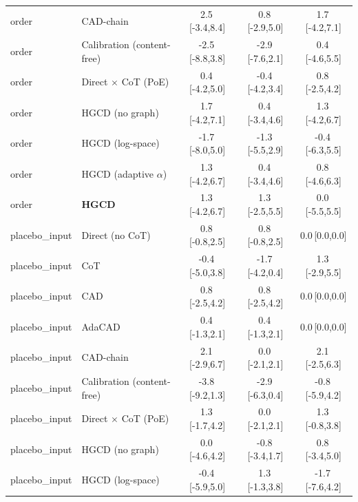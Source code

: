 \begin{tabular}{llccc}
order & CAD-chain & 2.5\,{\scriptsize[-3.4,8.4]} & 0.8\,{\scriptsize[-2.9,5.0]} & 1.7\,{\scriptsize[-4.2,7.1]} \\
order & Calibration (content-free) & -2.5\,{\scriptsize[-8.8,3.8]} & -2.9\,{\scriptsize[-7.6,2.1]} & 0.4\,{\scriptsize[-4.6,5.5]} \\
order & Direct $\times$ CoT (PoE) & 0.4\,{\scriptsize[-4.2,5.0]} & -0.4\,{\scriptsize[-4.2,3.4]} & 0.8\,{\scriptsize[-2.5,4.2]} \\
order & HGCD (no graph) & 1.7\,{\scriptsize[-4.2,7.1]} & 0.4\,{\scriptsize[-3.4,4.6]} & 1.3\,{\scriptsize[-4.2,6.7]} \\
order & HGCD (log-space) & -1.7\,{\scriptsize[-8.0,5.0]} & -1.3\,{\scriptsize[-5.5,2.9]} & -0.4\,{\scriptsize[-6.3,5.5]} \\
order & HGCD (adaptive $\alpha$) & 1.3\,{\scriptsize[-4.2,6.7]} & 0.4\,{\scriptsize[-3.4,4.6]} & 0.8\,{\scriptsize[-4.6,6.3]} \\
order & \textbf{HGCD} & 1.3\,{\scriptsize[-4.2,6.7]} & 1.3\,{\scriptsize[-2.5,5.5]} & 0.0\,{\scriptsize[-5.5,5.5]} \\
\midrule
placebo\_input & Direct (no CoT) & 0.8\,{\scriptsize[-0.8,2.5]} & 0.8\,{\scriptsize[-0.8,2.5]} & 0.0\,{\scriptsize[0.0,0.0]} \\
placebo\_input & CoT & -0.4\,{\scriptsize[-5.0,3.8]} & -1.7\,{\scriptsize[-4.2,0.4]} & 1.3\,{\scriptsize[-2.9,5.5]} \\
placebo\_input & CAD & 0.8\,{\scriptsize[-2.5,4.2]} & 0.8\,{\scriptsize[-2.5,4.2]} & 0.0\,{\scriptsize[0.0,0.0]} \\
placebo\_input & AdaCAD & 0.4\,{\scriptsize[-1.3,2.1]} & 0.4\,{\scriptsize[-1.3,2.1]} & 0.0\,{\scriptsize[0.0,0.0]} \\
placebo\_input & CAD-chain & 2.1\,{\scriptsize[-2.9,6.7]} & 0.0\,{\scriptsize[-2.1,2.1]} & 2.1\,{\scriptsize[-2.5,6.3]} \\
placebo\_input & Calibration (content-free) & -3.8\,{\scriptsize[-9.2,1.3]} & -2.9\,{\scriptsize[-6.3,0.4]} & -0.8\,{\scriptsize[-5.9,4.2]} \\
placebo\_input & Direct $\times$ CoT (PoE) & 1.3\,{\scriptsize[-1.7,4.2]} & 0.0\,{\scriptsize[-2.1,2.1]} & 1.3\,{\scriptsize[-0.8,3.8]} \\
placebo\_input & HGCD (no graph) & 0.0\,{\scriptsize[-4.6,4.2]} & -0.8\,{\scriptsize[-3.4,1.7]} & 0.8\,{\scriptsize[-3.4,5.0]} \\
placebo\_input & HGCD (log-space) & -0.4\,{\scriptsize[-5.9,5.0]} & 1.3\,{\scriptsize[-1.3,3.8]} & -1.7\,{\scriptsize[-7.6,4.2]} \\

\end{tabular}
